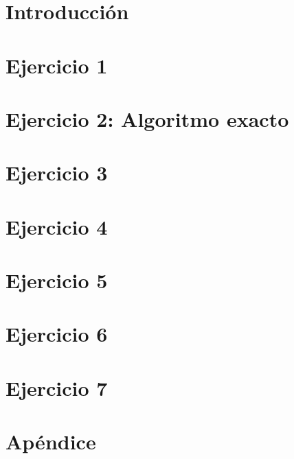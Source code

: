 \documentclass[hidelinks,a4paper,12pt, nofootinbib]{article}
\begin{document}
\maketitle

\tableofcontents
\newpage

\section{Introducción}

\newpage

\section{Ejercicio 1}

\newpage

\section{Ejercicio 2: Algoritmo exacto}

\newpage

\section{Ejercicio 3}

\newpage


\section{Ejercicio 4}

\newpage


\section{Ejercicio 5}

\newpage

\section{Ejercicio 6}

\newpage

\section{Ejercicio 7}

\newpage

\section{Apéndice}


\newpage
\printbibliography
\end{document}

